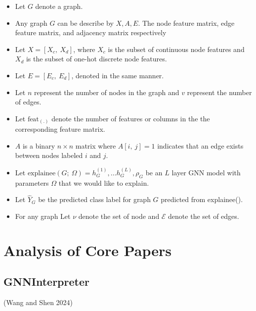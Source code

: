 \documentclass[
  11pt,
  letterpaper,
]{article}
\begin{document}
\begin{itemize}
\item
  Let \(G\) denote a graph.
\item
  Any graph \(G\) can be describe by \(X, A, E\). The node feature
  matrix, edge feature matrix, and adjacency matrix respectively
\item
  Let \(X = [X_c, \ X_d]\), where \(X_c\) is the subset of continuous
  node features and \(X_d\) is the subset of one-hot discrete node
  features.
\item
  Let \(E = [E_c, \ E_d]\), denoted in the same manner.
\item
  Let \(n\) represent the number of nodes in the graph and \(v\)
  represent the number of edges.
\item
  Let \(\text{feat}_{(.)}\) denote the number of features or columns in
  the the corresponding feature matrix.
\item
  \(A\) is a binary \(n \times n\) matrix where \(A[i, \ j] = 1\)
  indicates that an edge exists between nodes labeled \(i\) and \(j\).
\item
  Let
  \(\text{explainee}(G; \ \Omega) = h^{(1)}_G, \dots h^{(L)}_G, \rho_G\)
  be an \(L\) layer GNN model with parameters \(\Omega\) that we would
  like to explain.
\item
  Let \(\hat Y_G\) be the predicted class label for graph \(G\)
  predicted from explainee().
\item
  For any graph Let \(\nu\) denote the set of node and \(\mathcal{E}\)
  denote the set of edges.
\end{itemize}

\hypertarget{analysis-of-core-papers}{%
\section{Analysis of Core Papers}\label{analysis-of-core-papers}}

\hypertarget{gnninterpreter}{%
\subsection{GNNInterpreter}\label{gnninterpreter}}

(Wang and Shen 2024)
\end{document}
